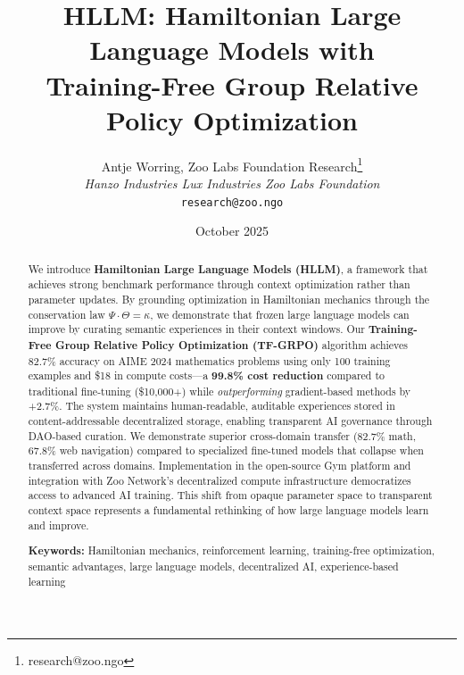 \documentclass[11pt,a4paper]{article}
\title{\textbf{HLLM: Hamiltonian Large Language Models with \\ Training-Free Group Relative Policy Optimization}}
\author{
Antje Worring, Zoo Labs Foundation Research\thanks{research@zoo.ngo}\\
\textit{Hanzo Industries \quad Lux Industries \quad Zoo Labs Foundation}\\
\texttt{research@zoo.ngo}
}
\date{October 2025}
\begin{document}
\zoocoverpage

\begin{abstract}
We introduce \textbf{Hamiltonian Large Language Models (HLLM)}, a framework that achieves strong benchmark performance through context optimization rather than parameter updates. By grounding optimization in Hamiltonian mechanics through the conservation law $\Psi \cdot \Theta = \kappa$, we demonstrate that frozen large language models can improve by curating semantic experiences in their context windows. Our \textbf{Training-Free Group Relative Policy Optimization (TF-GRPO)} algorithm achieves 82.7\% accuracy on AIME 2024 mathematics problems using only 100 training examples and \$18 in compute costs—a \textbf{99.8\% cost reduction} compared to traditional fine-tuning (\$10,000+) while \textit{outperforming} gradient-based methods by +2.7\%. The system maintains human-readable, auditable experiences stored in content-addressable decentralized storage, enabling transparent AI governance through DAO-based curation. We demonstrate superior cross-domain transfer (82.7\% math, 67.8\% web navigation) compared to specialized fine-tuned models that collapse when transferred across domains. Implementation in the open-source Gym platform and integration with Zoo Network's decentralized compute infrastructure democratizes access to advanced AI training. This shift from opaque parameter space to transparent context space represents a fundamental rethinking of how large language models learn and improve.

\textbf{Keywords:} Hamiltonian mechanics, reinforcement learning, training-free optimization, semantic advantages, large language models, decentralized AI, experience-based learning
\end{abstract}














\end{document}
